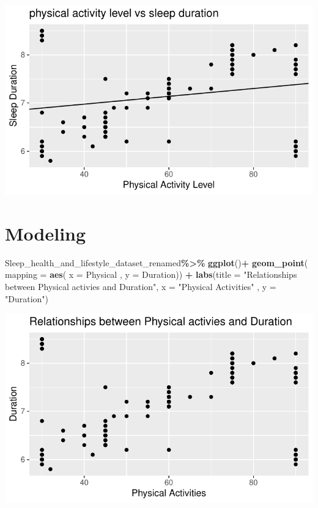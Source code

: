 \documentclass[
  11pt,
]{article}
\newenvironment{Shaded}{\begin{snugshade}}{\end{snugshade}}
\newcommand{\AttributeTok}[1]{\textcolor[rgb]{0.13,0.29,0.53}{#1}}
\newcommand{\FunctionTok}[1]{\textcolor[rgb]{0.13,0.29,0.53}{\textbf{#1}}}
\newcommand{\NormalTok}[1]{#1}
\newcommand{\SpecialCharTok}[1]{\textcolor[rgb]{0.81,0.36,0.00}{\textbf{#1}}}
\newcommand{\StringTok}[1]{\textcolor[rgb]{0.31,0.60,0.02}{#1}}
\begin{document}
\begin{center}\includegraphics[width=0.7\linewidth]{SleepHelath_files/figure-latex/unnamed-chunk-22-1} \end{center}

\hypertarget{modeling}{%
\section{Modeling}\label{modeling}}

\begin{Shaded}
\begin{Highlighting}[]
\NormalTok{Sleep\_health\_and\_lifestyle\_dataset\_renamed}\SpecialCharTok{\%\textgreater{}\%}
  \FunctionTok{ggplot}\NormalTok{()}\SpecialCharTok{+}
  \FunctionTok{geom\_point}\NormalTok{( }\AttributeTok{mapping =} \FunctionTok{aes}\NormalTok{( }\AttributeTok{x  =}\NormalTok{ Physical , }\AttributeTok{y =}\NormalTok{ Duration)) }\SpecialCharTok{+}
  \FunctionTok{labs}\NormalTok{(}\AttributeTok{title =} \StringTok{"Relationships between Physical activies and Duration"}\NormalTok{,}
       \AttributeTok{x =} \StringTok{"Physical Activities"}\NormalTok{ , }\AttributeTok{y =} \StringTok{"Duration"}\NormalTok{)}
\end{Highlighting}
\end{Shaded}

\begin{center}\includegraphics[width=0.7\linewidth]{SleepHelath_files/figure-latex/unnamed-chunk-23-1} \end{center}
\end{document}
